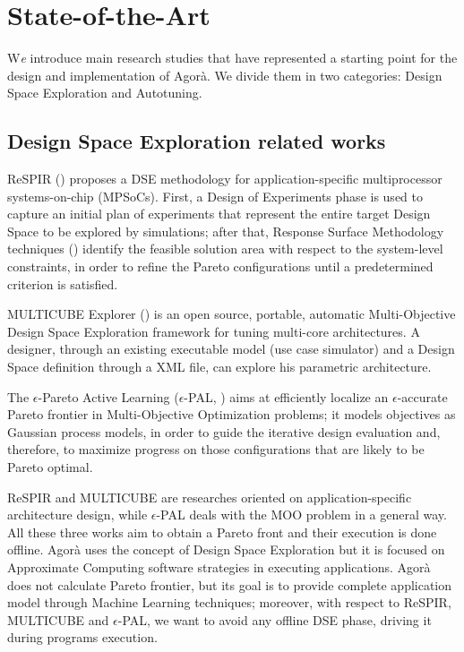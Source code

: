 \chapter{State-of-the-Art}\label{sota}

\lettrine{W}{}\textit{e} introduce main research studies that have represented a starting point for the design and implementation of A\-go\-rà. We divide them in two categories: Design Space Exploration and Autotuning.

\section{Design Space Exploration related works}

ReSPIR (\cite{palermo2009respir}) proposes a DSE methodology for application-spe\-cif\-ic multiprocessor systems-on-chip (MPSoCs). First, a Design of Experiments phase is used to capture an initial plan of experiments that represent the entire target Design Space to be explored by simulations; after that, Response Surface Methodology techniques (\cite{khuri2010response}) identify the feasible solution area with respect to the system-level constraints, in order to refine the Pareto configurations until a predetermined criterion is satisfied.

MULTICUBE Explorer (\cite{silvano2011multicube}) is an open source, portable, automatic Multi-Objective Design Space Exploration framework for tuning multi-core architectures. A designer, through an existing executable model (use case simulator) and a Design Space definition through a XML file, can explore his parametric architecture.

The $\epsilon$-Pareto Active Learning ($\epsilon$-PAL, \cite{zuluaga2016e}) aims at efficiently localize an $\epsilon$-accurate Pareto frontier in Multi-Objective Optimization problems; it models objectives as Gaussian process models, in order to guide the iterative design evaluation and, therefore, to maximize progress on those configurations that are likely to be Pareto optimal.

ReSPIR and MULTICUBE are researches oriented on ap\-pli\-ca\-tion-specific architecture design, while $\epsilon$-PAL deals with the MOO problem in a general way. All these three works aim to obtain a Pareto front and their execution is done offline. Agorà uses the concept of Design Space Exploration but it is focused on Approximate Computing software strategies in executing applications. Agorà does not calculate Pareto frontier, but its goal is to provide complete application model through Machine Learning techniques; moreover, with respect to ReSPIR, MULTICUBE and $\epsilon$-PAL, we want to avoid any offline DSE phase, driving it during programs execution.

